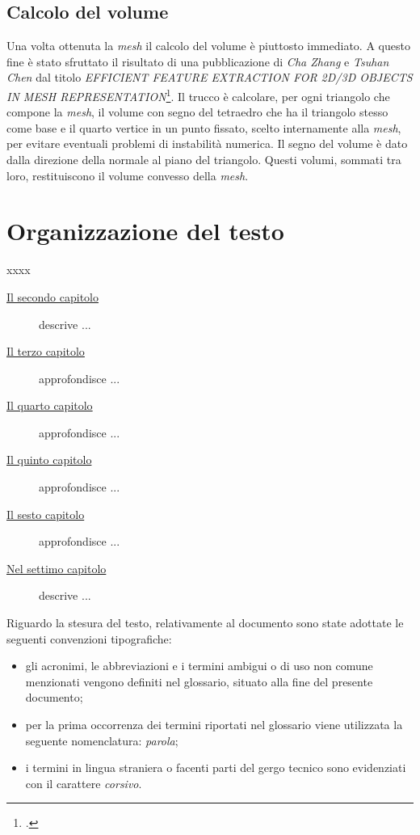 \subsection{Calcolo del volume}
Una volta ottenuta la \emph{mesh} il calcolo del volume è piuttosto immediato. A questo fine è stato sfruttato il risultato di una pubblicazione di \emph{Cha Zhang} e \emph{Tsuhan Chen} dal titolo \emph{EFFICIENT FEATURE EXTRACTION FOR 2D/3D OBJECTS
IN MESH REPRESENTATION}\footcite{site: http://research.microsoft.com/en-us/um/people/chazhang/publications/icip01_ChaZhang.pdf}.
Il trucco è calcolare, per ogni triangolo che compone la \emph{mesh}, il volume con segno del tetraedro che ha il triangolo stesso come base e il quarto vertice in un punto fissato, scelto internamente alla \emph{mesh}, per evitare eventuali problemi di instabilità numerica. Il segno del volume è dato dalla direzione della normale al piano del triangolo. Questi volumi, sommati tra loro, restituiscono il volume convesso della \emph{mesh}.


\section{Organizzazione del testo}
xxxx
\begin{description}

    \item[{\hyperref[cap:processi-metodologie]{Il secondo capitolo}}] descrive ...
    
    \item[{\hyperref[cap:descrizione-stage]{Il terzo capitolo}}] approfondisce ...
    
    \item[{\hyperref[cap:analisi-requisiti]{Il quarto capitolo}}] approfondisce ...
    
    \item[{\hyperref[cap:progettazione-codifica]{Il quinto capitolo}}] approfondisce ...
    
    \item[{\hyperref[cap:verifica-validazione]{Il sesto capitolo}}] approfondisce ...
    
    \item[{\hyperref[cap:conclusioni]{Nel settimo capitolo}}] descrive ...
\end{description}

Riguardo la stesura del testo, relativamente al documento sono state adottate le seguenti convenzioni tipografiche:
\begin{itemize}
	\item gli acronimi, le abbreviazioni e i termini ambigui o di uso non comune menzionati vengono definiti nel glossario, situato alla fine del presente documento;
	\item per la prima occorrenza dei termini riportati nel glossario viene utilizzata la seguente nomenclatura: \emph{parola}\glsfirstoccur;
	\item i termini in lingua straniera o facenti parti del gergo tecnico sono evidenziati con il carattere \emph{corsivo}.
\end{itemize}